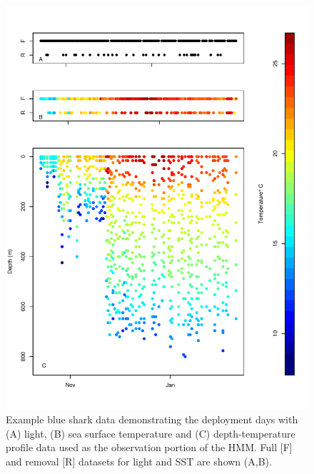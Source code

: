 \begin{figure}[p]
\centering
\includegraphics[width=1\textwidth]{images/C2_Fig1.pdf}
\caption[Example pop-up satellite archival tag data]{Example blue shark data demonstrating the deployment days with
(A) light, (B) sea surface temperature and (C)
depth-temperature profile data used as the observation portion of the
HMM. Full [F] and removal [R] datasets for light and SST are shown
(A,B).}
\label{fig:c2f1}
\end{figure}

